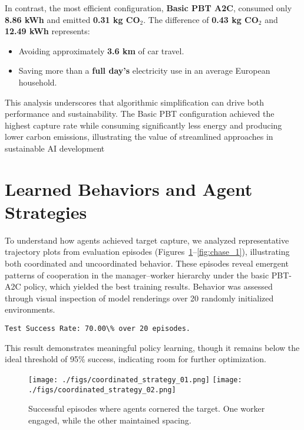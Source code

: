 \documentclass[12pt,a4paper,twoside,openany]{book}
\begin{document}
In contrast, the most efficient configuration, \textbf{Basic PBT A2C}, consumed only \textbf{8.86 kWh} and emitted \textbf{0.31 kg CO$_2$}. The difference of \textbf{0.43 kg CO$_2$} and \textbf{12.49 kWh} represents:
\begin{itemize}
  \item Avoiding approximately \textbf{3.6 km} of car travel.
  \item Saving more than a \textbf{full day's} electricity use in an average European household.
\end{itemize}

This analysis underscores that algorithmic simplification can drive both performance and sustainability. The Basic PBT configuration achieved the highest capture rate while consuming significantly less energy and producing lower carbon emissions, illustrating the value of streamlined approaches in sustainable AI development

\section{Learned Behaviors and Agent Strategies}

To understand how agents achieved target capture, we analyzed representative trajectory plots from evaluation episodes (Figures~\ref{fig:cornering_1}–\ref{fig:chase_1}), illustrating both coordinated and uncoordinated behavior. These episodes reveal emergent patterns of cooperation in the manager–worker hierarchy under the basic PBT-A2C policy, which yielded the best training results. Behavior was assessed through visual inspection of model renderings over 20 randomly initialized environments. 

\begin{lstlisting}
Test Success Rate: 70.00\% over 20 episodes.
\end{lstlisting}

This result demonstrates meaningful policy learning, though it remains below the ideal threshold of 95\% success, indicating room for further optimization.

\begin{figure}[H]
\centering
\texttt{[image: ./figs/coordinated\_strategy\_01.png]}
\texttt{[image: ./figs/coordinated\_strategy\_02.png]}
\captionsetup{font=small}
\caption{Successful episodes where agents cornered the target. One worker engaged, while the other maintained spacing.}
\label{fig:cornering_1}
\end{figure}
\end{document}
